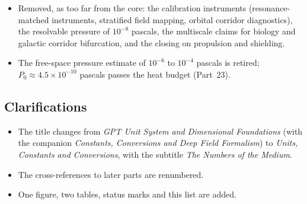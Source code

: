 \documentclass[11pt,a4paper]{article}
\begin{document}
\begin{itemize}
\item Removed, as too far from the core: the calibration instruments (resonance-matched instruments, stratified field mapping, orbital corridor diagnostics), the resolvable pressure of $10^{-8}$ pascals, the multiscale claims for biology and galactic corridor bifurcation, and the closing on propulsion and shielding.
\item The free-space pressure estimate of $10^{-6}$ to $10^{-4}$ pascals is retired; $P_0\approx4.5\times10^{-10}$ pascals passes the heat budget (Part~23).
\end{itemize}

\subsection*{Clarifications}
\begin{itemize}
\item The title changes from \emph{GPT Unit System and Dimensional Foundations} (with the companion \emph{Constants, Conversions and Deep Field Formalism}) to \emph{Units, Constants and Conversions}, with the subtitle \emph{The Numbers of the Medium}.
\item The cross-references to later parts are renumbered.
\item One figure, two tables, status marks and this list are added.
\end{itemize}

\newpage

\nocite{rashadaPart14,rashadaPart15,rashadaPart16,rashadaPart19,rashadaPart22}

\end{document}
